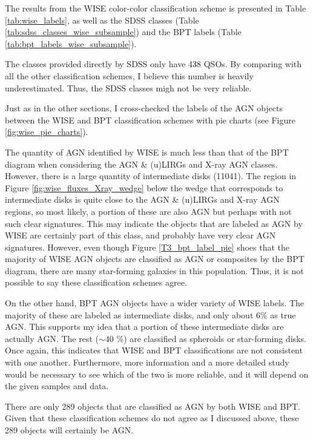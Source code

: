 \documentclass[letterpaper, oneside]{article}
\begin{document}
	The results from the WISE color-color classification scheme is presented in Table \ref{tab:wise_labels}, as well as the SDSS classes (Table \ref{tab:sdss_classes_wise_subsample}) and the BPT labels (Table \ref{tab:bpt_labels_wise_subsample}).
	
	The classes provided directly by SDSS only have 438 QSOs. By comparing with all the other classification schemes, I believe this number is heavily underestimated. Thus, the SDSS classes migh not be very reliable.
	
	Just as in the other sections, I cross-checked the labels of the AGN objects between the WISE and BPT classification schemes with pie charts (see Figure \ref{fig:wise_pie_charts}).

	The quantity of AGN identified by WISE is much less than that of the BPT diagram when considering the AGN \& (u)LIRGs and X-ray AGN classes. However, there is a large quantity of intermediate disks (11041). The region in Figure \ref{fig:wise_fluxes_Xray_wedge} below the wedge that corresponds to intermediate disks is quite close to the AGN \& (u)LIRGs and X-ray AGN regions, so most likely, a portion of these are also AGN but perhaps with not such clear signatures. This may indicate the objects that are labeled as AGN by WISE are certainly part of this class, and probably have very clear AGN signatures. However, even though Figure \ref{T3_bpt_label_pie} shoes that the majority of WISE AGN objects are classified as AGN or composites by the BPT diagram, there are many star-forming galaxies in this population. Thus, it is not possible to say these classification schemes agree.
	
	On the other hand, BPT AGN objects have a wider variety of WISE labels. The majority of these are labeled as intermediate disks, and only about 6\% as true AGN. This supports my idea that a portion of these intermediate disks are actually AGN. The rest ($\sim 40$ \%) are classified as spheroids or star-forming disks. Once again, this indicates that WISE and BPT classifications are not consistent with one another. Furthermore, more information and a more detailed study would be necessary to see which of the two is more reliable, and it will depend on the given samples and data.

	There are only 289 objects that are classified as AGN by both WISE and BPT. Given that these classification schemes do not agree as I discussed above, these 289 objects will certainly be AGN.
\end{document}
